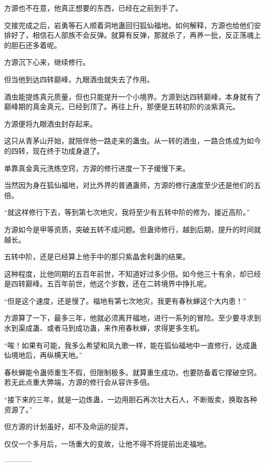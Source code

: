 \begin{this_body}
方源也不在意，他真正想要的东西，已经在之前到手了。

交接完成之后，岩勇等石人顺着洞地蛊回归狐仙福地。如何解释，方源也给他们安排好了，相信石人部族不会反弹。就算有反弹，那就杀了，再养一批，反正荡魂上的胆石还多着呢。

方源沉下心来，继续修行。

但当他到达四转巅峰，九眼酒虫就失去了作用。

酒虫能提炼真元质量，但也只能提升一个小境界。方源到达四转巅峰，本身就有了巅峰期的真金真元，已经到顶了。再往上升，那便是五转初阶的淡紫真元。

方源便将九眼酒虫封存起来。

这只从青茅山开始，就陪伴他一路走来的蛊虫。从一转的酒虫，一路合炼成为如今的四转，现在终于功成身退了。

单靠真金真元洗练空窍，方源的修行进度一下子缓慢下来。

当然因为身在狐仙福地，对比外界的普通蛊师，方源的修行速度至少还是他们的五倍。

“就这样修行下去，等到第七次地灾，我将至少有五转中阶的修为，接近高阶。”

方源如今是甲等资质，突破五转不成问题。但蛊师修行，越到后期，提升的时间就越长。

五转中阶，还是已经算上他手中的那只紫晶舍利蛊的结果。

这种程度，比他同期的五百年前世，不知道好过多少倍。如今他三十有余，却已经是四转巅峰。五百年前世，他这个岁数，还在二转境界中挣扎呢。

“但是这个速度，还是慢了。福地有第七次地灾，我更有春秋蝉这个大内患！”

方源算了一下，最多三年，他就必须离开福地，进行一系列的冒险。至少要寻求到水到渠成蛊、或者马到成功蛊，来作用春秋蝉，求得更多生机。

“唉！如果有可能，我多么希望和凤九歌一样，能在狐仙福地中一直修行，达成蛊仙境地后，再纵横天地。”

春秋蝉能令蛊师重生不假，但限制极多。就算重生成功，也要防备着它撑破空窍。若无此点重大弊端，方源的修行会从容许多倍。

“接下来的三年，就是一边炼蛊，一边用胆石再次壮大石人，不断贩卖，换取各种资源了。”

但方源的计划虽好，却不及命运的捉弄。

仅仅一个多月后，一场重大的变故，让他不得不将提前出走福地。

------------

\end{this_body}


